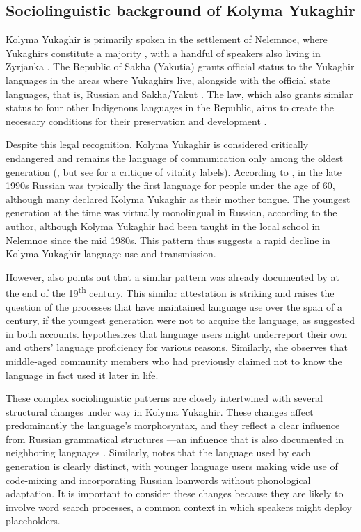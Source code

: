 \documentclass[output=paper,colorlinks,citecolor=brown
\ChapterDOI{10.5281/zenodo.15697581}
]{langscibook}
\begin{document}
\subsection{Sociolinguistic background of Kolyma Yukaghir}

Kolyma Yukaghir is primarily spoken in the settlement of Nelemnoe, where  Yukaghirs constitute a majority \citep[20]{Maslova2003}, with a handful of speakers also living in Zyrjanka \citep{Nagasaki2010}. 
The Republic of Sakha (Yakutia) grants official status to the Yukaghir languages in the areas where Yukaghirs live, alongside with the official state languages, that is, Russian and Sakha/Yakut \citep{Grenoble2022}. 
The law, which also grants similar status to four other Indigenous languages in the Republic, aims to create the necessary conditions for their preservation and development \citep{Vinokurova-etal2022}.

Despite this legal recognition, Kolyma Yukaghir is considered critically endangered and remains the language of communication only among the oldest generation (\citealt{Grenoble2003}, but see \citealt{Kazakevich-etal2022} for a critique of vitality labels).
According to \citet[20]{Maslova2003}, in the late 1990s Russian was typically the first language for people under the age of 60, although many declared Kolyma Yukaghir as their mother tongue.
The youngest generation at the time was virtually monolingual in Russian, according to the author, although Kolyma Yukaghir had been taught in the local school in Nelemnoe since the mid 1980s. 
This pattern thus suggests a rapid decline in Kolyma Yukaghir language use and transmission. 

However, \citet[22--23]{Maslova2003} also points out that a similar pattern was already documented by \citet{Jochelson1926a} at the end of the 19\textsuperscript{th} century.
This similar attestation is striking and raises the question of the processes that have maintained language use over the span of a century, if the youngest generation were not to acquire the language, as suggested in both accounts. 
\citet{Maslova2003} hypothesizes that language users might underreport their own and others' language proficiency for various reasons.
Similarly, she observes that middle-aged community members who had previously claimed not to know the language in fact used it later in life. 

These complex sociolinguistic patterns are closely intertwined with several structural changes under way in Kolyma Yukaghir. 
These changes affect predominantly the language's morphosyntax, and they reflect a clear influence from Russian grammatical structures \citep{Matic2008influence}—an influence that is also documented in neighboring languages \citep{Grenoble2000, Pakendorf2024, Anderson2017, Kantarovich2020}.
Similarly, \citet[24]{Maslova2003} notes that the language used by each generation is clearly distinct, with younger language users making wide use of code-mixing and incorporating Russian loanwords without phonological adaptation. 
It is important to consider these changes because they are likely to involve word search processes, a common context in which speakers might deploy placeholders. 
\end{document}
